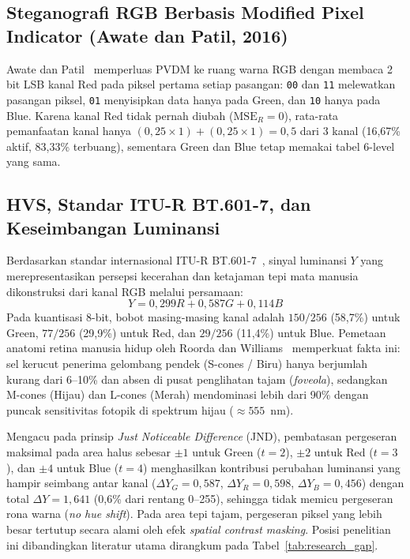 \documentclass[12pt,journal]{IEEEtran}
\begin{document}
\subsection{Steganografi RGB Berbasis Modified Pixel Indicator (Awate dan Patil, 2016)}
Awate dan Patil~\cite{awate2016high} memperluas PVDM ke ruang warna RGB dengan membaca 2 bit LSB kanal Red pada piksel pertama setiap pasangan: \texttt{00} dan \texttt{11} melewatkan pasangan piksel, \texttt{01} menyisipkan data hanya pada Green, dan \texttt{10} hanya pada Blue. Karena kanal Red tidak pernah diubah ($\text{MSE}_R = 0$), rata-rata pemanfaatan kanal hanya $(0{,}25 \times 1) + (0{,}25 \times 1) = 0{,}5$ dari 3 kanal (16,67\% aktif, 83,33\% terbuang), sementara Green dan Blue tetap memakai tabel 6-level yang sama.

\subsection{HVS, Standar ITU-R BT.601-7, dan Keseimbangan Luminansi}
Berdasarkan standar internasional ITU-R BT.601-7~\cite{itur2011bt601}, sinyal luminansi $Y$ yang merepresentasikan persepsi kecerahan dan ketajaman tepi mata manusia dikonstruksi dari kanal RGB melalui persamaan:
\begin{equation}
Y = 0{,}299R + 0{,}587G + 0{,}114B
\label{eq:bt601}
\end{equation}
Pada kuantisasi 8-bit, bobot masing-masing kanal adalah $150/256$ (58,7\%) untuk Green, $77/256$ (29,9\%) untuk Red, dan $29/256$ (11,4\%) untuk Blue. Pemetaan anatomi retina manusia hidup oleh Roorda dan Williams~\cite{roorda1999arrangement} memperkuat fakta ini: sel kerucut penerima gelombang pendek (S-cones / Biru) hanya berjumlah kurang dari 6--10\% dan absen di pusat penglihatan tajam (\textit{foveola}), sedangkan M-cones (Hijau) dan L-cones (Merah) mendominasi lebih dari 90\% dengan puncak sensitivitas fotopik di spektrum hijau ($\approx 555$~nm).

Mengacu pada prinsip \textit{Just Noticeable Difference} (JND), pembatasan pergeseran maksimal pada area halus sebesar $\pm 1$ untuk Green ($t=2$), $\pm 2$ untuk Red ($t=3$), dan $\pm 4$ untuk Blue ($t=4$) menghasilkan kontribusi perubahan luminansi yang hampir seimbang antar kanal ($\Delta Y_G = 0{,}587$, $\Delta Y_R = 0{,}598$, $\Delta Y_B = 0{,}456$) dengan total $\Delta Y = 1{,}641$ (0,6\% dari rentang 0--255), sehingga tidak memicu pergeseran rona warna (\textit{no hue shift}). Pada area tepi tajam, pergeseran piksel yang lebih besar tertutup secara alami oleh efek \textit{spatial contrast masking}. Posisi penelitian ini dibandingkan literatur utama dirangkum pada Tabel~\ref{tab:research_gap}.
\end{document}
